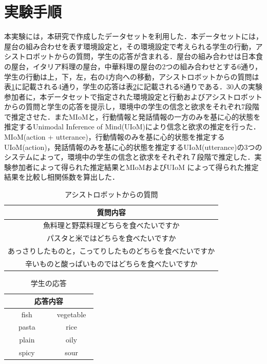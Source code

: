 \section{実験手順}

\par
本実験には，本研究で作成したデータセットを利用した．本データセットには，屋台の組み合わせを表す環境設定と，その環境設定で考えられる学生の行動，アシストロボットからの質問，学生の応答が含まれる．屋台の組み合わせは日本食の屋台，イタリア料理の屋台，中華料理の屋台の2つの組み合わせとする6通り，学生の行動は上，下，左，右の4方向への移動，アシストロボットからの質問は表\ref{tab:question}に記載される4通り，学生の応答は表\ref{tab:answer}に記載される8通りである．30人の実験参加者に，本データセットで指定された環境設定と行動およびアシストロボットからの質問と学生の応答を提示し，環境中の学生の信念と欲求をそれぞれ7段階で推定させた．またMIoMと，行動情報と発話情報の一方のみを基に心的状態を推定するUnimodal Inference of Mind(UIoM)により信念と欲求の推定を行った．MIoM(action + utterance)，行動情報のみを基に心的状態を推定するUIoM(action)，発話情報のみを基に心的状態を推定するUIoM(utterance)の3つのシステムによって，環境中の学生の信念と欲求をそれぞれ７段階で推定した．実験参加者によって得られた推定結果とMIoMおよびUIoM によって得られた推定結果を比較し相関係数を算出した．

\begin{table}[htb]
  \begin{center}
  \caption{アシストロボットからの質問}
  \label{tab:question}
  \begin{tabular}{c} \hline
    質問内容\\\hline
    魚料理と野菜料理どちらを食べたいですか\\
    パスタと米ではどちらを食べたいですか\\
    あっさりしたものと，こってりしたものどちらを食べたいですか\\
    辛いものと酸っぱいものではどちらを食べたいですか\\\hline
  \end{tabular}
\end{center}
\end{table}

\begin{table}[htb]
  \begin{center}
  \caption{学生の応答}
  \label{tab:answer}
  \begin{tabular}{cc} \hline
    \multicolumn{2}{c}{応答内容}\\\hline
    　fish　&　vegetable　\\
    　pasta　&　rice　\\
    　plain　&　oily　\\
    　spicy　&　sour　\\\hline
  \end{tabular}
\end{center}
\end{table}


